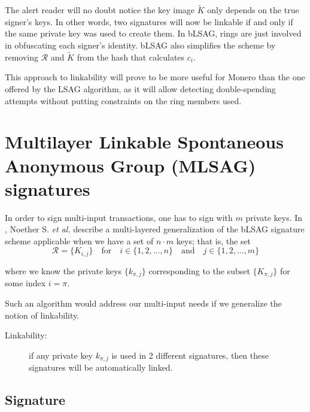 The alert reader will no doubt notice the key image $\tilde{K}$ only depends on the true signer's keys. In other words, two signatures will now be linkable if and only if the same private key was used to create them. In bLSAG, rings are just involved in obfuscating each signer’s identity. bLSAG also simplifies the scheme by removing $\mathcal{R}$ and $\tilde{K}$ from the hash that calculates $c_i$.

This approach to linkability will prove to be more useful for Monero than the one offered by the LSAG algorithm, as it will allow detecting double-spending attempts without putting constraints on the ring members used.



\section{Multilayer Linkable Spontaneous Anonymous Group (MLSAG) signatures}
\label{sec:MLSAG}

In order to sign multi-input transactions, one has to sign with \(m\) private keys. In \cite{cryptoeprint:2015:1098, ledger34}, Noether S. {\em et al.} describe a multi-layered generalization of the bLSAG signature scheme applicable when we have a set of \(n \cdot m\) keys; that is, the set\vspace{.2cm}
\[\mathcal{R} = \{ K_{i,j} \}  \quad \textrm{for} \quad  i \in \{1, 2, ..., n\} \quad \textrm{and} \quad j \in \{1, 2, ..., m\}\] 

where we know the private keys \(\{k_{\pi, j} \} \) corresponding to the subset \(\{K_{\pi, j}\} \) for some index \(i = \pi\).

Such an algorithm would address our multi-input needs if we generalize the notion of linkability.
\begin{description}
	\item[Linkability:] if any private key \(k_{\pi, j}\) is used in 2 different signatures, then these signatures will be automatically linked.
\end{description}


\subsection*{Signature}

